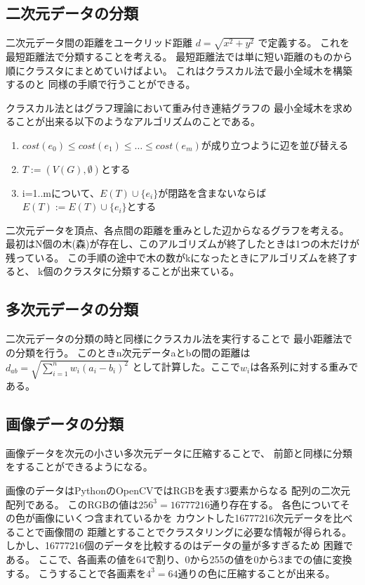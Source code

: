 \documentclass[dvipdfmx]{jsarticle}
\begin{document}
\subsection{二次元データの分類}

二次元データ間の距離をユークリッド距離
$d = \sqrt{x^2 + y^2}$
で定義する。
これを最短距離法で分類することを考える。
最短距離法では単に短い距離のものから順にクラスタにまとめていけばよい。
これはクラスカル法で最小全域木を構築するのと
同様の手順で行うことができる。

クラスカル法とはグラフ理論において重み付き連結グラフの
最小全域木を求めることが出来る以下のようなアルゴリズムのことである。
\begin{enumerate}
  \item $cost(e_0) \leq cost(e_1) \leq \dots \leq cost(e_m)$が成り立つように辺を並び替える
  \item $T:=(V(G),\emptyset)$とする
  \item i=1..mについて、$E(T) \cup \{e_i\}$が閉路を含まないならば$E(T) := E(T) \cup \{e_i\}$とする
\end{enumerate}
二次元データを頂点、各点間の距離を重みとした辺からなるグラフを考える。
最初はN個の木(森)が存在し、このアルゴリズムが終了したときは1つの木だけが残っている。
この手順の途中で木の数がkになったときにアルゴリズムを終了すると、
k個のクラスタに分類することが出来ている。


\subsection{多次元データの分類}

二次元データの分類の時と同様にクラスカル法を実行することで
最小距離法での分類を行う。
このときn次元データaとbの間の距離は
$\displaystyle d_{ab} = \sqrt{ \sum_{i=1}^{n}w_i(a_i - b_i)^2 }$
として計算した。ここで$w_i$は各系列に対する重みである。

\subsection{画像データの分類}

画像データを次元の小さい多次元データに圧縮することで、
前節と同様に分類をすることができるようになる。

画像のデータはPythonのOpenCVではRGBを表す3要素からなる
配列の二次元配列である。
このRGBの値は$256^3=16777216$通り存在する。
各色についてその色が画像にいくつ含まれているかを
カウントした16777216次元データを比べることで画像間の
距離とすることでクラスタリングに必要な情報が得られる。
しかし、16777216個のデータを比較するのはデータの量が多すぎるため
困難である。
ここで、各画素の値を64で割り、0から255の値を0から3までの値に変換する。
こうすることで各画素を$4^3=64$通りの色に圧縮することが出来る。
\end{document}
